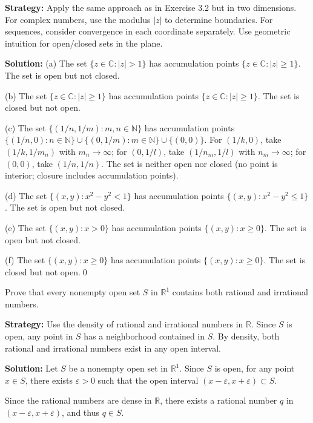 \noindent\textbf{Strategy:} Apply the same approach as in Exercise 3.2 but in two dimensions. For complex numbers, use the modulus $|z|$ to determine boundaries. For sequences, consider convergence in each coordinate separately. Use geometric intuition for open/closed sets in the plane.

\bigskip\noindent\textbf{Solution:}
(a) The set $\{z \in \mathbb{C} : |z| > 1\}$ has accumulation points $\{z \in \mathbb{C} : |z| \geq 1\}$. The set is open but not closed.

(b) The set $\{z \in \mathbb{C} : |z| \geq 1\}$ has accumulation points $\{z \in \mathbb{C} : |z| \geq 1\}$. The set is closed but not open.

(c) The set $\{(1/n, 1/m) : m,n \in \mathbb{N}\}$ has accumulation points $\{(1/n, 0) : n \in \mathbb{N}\} \cup \{(0, 1/m) : m \in \mathbb{N}\} \cup \{(0, 0)\}$. For $(1/k, 0)$, take $(1/k, 1/m_n)$ with $m_n \to \infty$; for $(0, 1/l)$, take $(1/n_m, 1/l)$ with $n_m \to \infty$; for $(0, 0)$, take $(1/n, 1/n)$. The set is neither open nor closed (no point is interior; closure includes accumulation points).

(d) The set $\{(x,y) : x^2 - y^2 < 1\}$ has accumulation points $\{(x,y) : x^2 - y^2 \leq 1\}$. The set is open but not closed.

(e) The set $\{(x,y) : x > 0\}$ has accumulation points $\{(x,y) : x \geq 0\}$. The set is open but not closed.

(f) The set $\{(x,y) : x \geq 0\}$ has accumulation points $\{(x,y) : x \geq 0\}$. The set is closed but not open.\qed


\begin{problembox}
Prove that every nonempty open set $S$ in $\mathbb{R}^1$ contains both rational and irrational numbers.
\end{problembox}

\noindent\textbf{Strategy:} Use the density of rational and irrational numbers in $\mathbb{R}$. Since $S$ is open, any point in $S$ has a neighborhood contained in $S$. By density, both rational and irrational numbers exist in any open interval.

\bigskip\noindent\textbf{Solution:} Let $S$ be a nonempty open set in $\mathbb{R}^1$. Since $S$ is open, for any point $x \in S$, there exists $\varepsilon > 0$ such that the open interval $(x-\varepsilon, x+\varepsilon) \subset S$.

Since the rational numbers are dense in $\mathbb{R}$, there exists a rational number $q$ in $(x-\varepsilon, x+\varepsilon)$, and thus $q \in S$.

